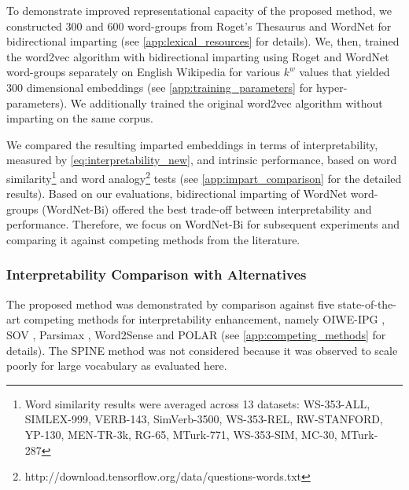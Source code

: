 \documentclass[11pt,a4paper]{article}
\begin{document}
To demonstrate improved representational capacity of the proposed method, we constructed 300 and 600 word-groups from Roget's Thesaurus and WordNet for bidirectional imparting (see \ref{app:lexical_resources} for details). 
We, then, trained the word2vec algorithm with bidirectional imparting using Roget and WordNet word-groups separately on English Wikipedia for various $k^w$ values that yielded 300 dimensional embeddings (see \ref{app:training_parameters} for hyper-parameters). We additionally trained the original word2vec algorithm without imparting on the same corpus. 

We compared the resulting imparted embeddings in terms of interpretability, measured by \eqref{eq:interpretability_new}, and intrinsic performance, based on word similarity\footnote{Word similarity results were averaged across 13 datasets: WS-353-ALL, SIMLEX-999, VERB-143, SimVerb-3500, WS-353-REL, RW-STANFORD, YP-130, MEN-TR-3k, RG-65, MTurk-771, WS-353-SIM, MC-30, MTurk-287} \citep{faruqui14communityEval} and word analogy\footnote{http://download.tensorflow.org/data/questions-words.txt} \citep{mikolov13word2vec_b} tests (see \ref{app:impart_comparison} for the detailed results). Based on our evaluations, bidirectional imparting of WordNet word-groups (WordNet-Bi) offered the best trade-off between interpretability and performance. Therefore, we focus on WordNet-Bi for subsequent experiments and comparing it against competing methods from the literature. 


\subsubsection{Interpretability Comparison with Alternatives}

The proposed method was demonstrated by comparison against \textcolor{black}{five} state-of-the-art competing methods for interpretability enhancement, namely OIWE-IPG \citep{luo15online}, SOV \citep{faruqui15sparse}, Parsimax \citep{park17rotated}, Word2Sense \citep{panigrahi19word2sense} and POLAR \citep{mathew20polar} (see \ref{app:competing_methods} for details). The SPINE \citep{subramanian18spine} method was not considered because it was observed to scale poorly for large vocabulary as evaluated here. 
\end{document}
